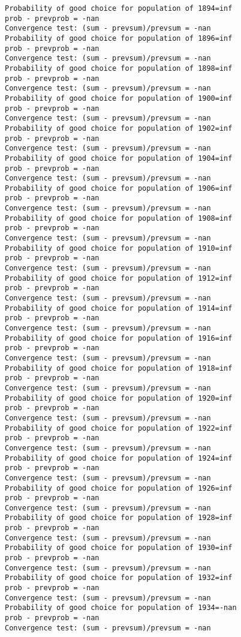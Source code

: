 \documentclass[11pt,onecolumn]{article}
\begin{document}
\begin{verbatim}
Probability of good choice for population of 1894=inf
prob - prevprob = -nan
Convergence test: (sum - prevsum)/prevsum = -nan
Probability of good choice for population of 1896=inf
prob - prevprob = -nan
Convergence test: (sum - prevsum)/prevsum = -nan
Probability of good choice for population of 1898=inf
prob - prevprob = -nan
Convergence test: (sum - prevsum)/prevsum = -nan
Probability of good choice for population of 1900=inf
prob - prevprob = -nan
Convergence test: (sum - prevsum)/prevsum = -nan
Probability of good choice for population of 1902=inf
prob - prevprob = -nan
Convergence test: (sum - prevsum)/prevsum = -nan
Probability of good choice for population of 1904=inf
prob - prevprob = -nan
Convergence test: (sum - prevsum)/prevsum = -nan
Probability of good choice for population of 1906=inf
prob - prevprob = -nan
Convergence test: (sum - prevsum)/prevsum = -nan
Probability of good choice for population of 1908=inf
prob - prevprob = -nan
Convergence test: (sum - prevsum)/prevsum = -nan
Probability of good choice for population of 1910=inf
prob - prevprob = -nan
Convergence test: (sum - prevsum)/prevsum = -nan
Probability of good choice for population of 1912=inf
prob - prevprob = -nan
Convergence test: (sum - prevsum)/prevsum = -nan
Probability of good choice for population of 1914=inf
prob - prevprob = -nan
Convergence test: (sum - prevsum)/prevsum = -nan
Probability of good choice for population of 1916=inf
prob - prevprob = -nan
Convergence test: (sum - prevsum)/prevsum = -nan
Probability of good choice for population of 1918=inf
prob - prevprob = -nan
Convergence test: (sum - prevsum)/prevsum = -nan
Probability of good choice for population of 1920=inf
prob - prevprob = -nan
Convergence test: (sum - prevsum)/prevsum = -nan
Probability of good choice for population of 1922=inf
prob - prevprob = -nan
Convergence test: (sum - prevsum)/prevsum = -nan
Probability of good choice for population of 1924=inf
prob - prevprob = -nan
Convergence test: (sum - prevsum)/prevsum = -nan
Probability of good choice for population of 1926=inf
prob - prevprob = -nan
Convergence test: (sum - prevsum)/prevsum = -nan
Probability of good choice for population of 1928=inf
prob - prevprob = -nan
Convergence test: (sum - prevsum)/prevsum = -nan
Probability of good choice for population of 1930=inf
prob - prevprob = -nan
Convergence test: (sum - prevsum)/prevsum = -nan
Probability of good choice for population of 1932=inf
prob - prevprob = -nan
Convergence test: (sum - prevsum)/prevsum = -nan
Probability of good choice for population of 1934=-nan
prob - prevprob = -nan
Convergence test: (sum - prevsum)/prevsum = -nan

\end{verbatim}
\end{document}
